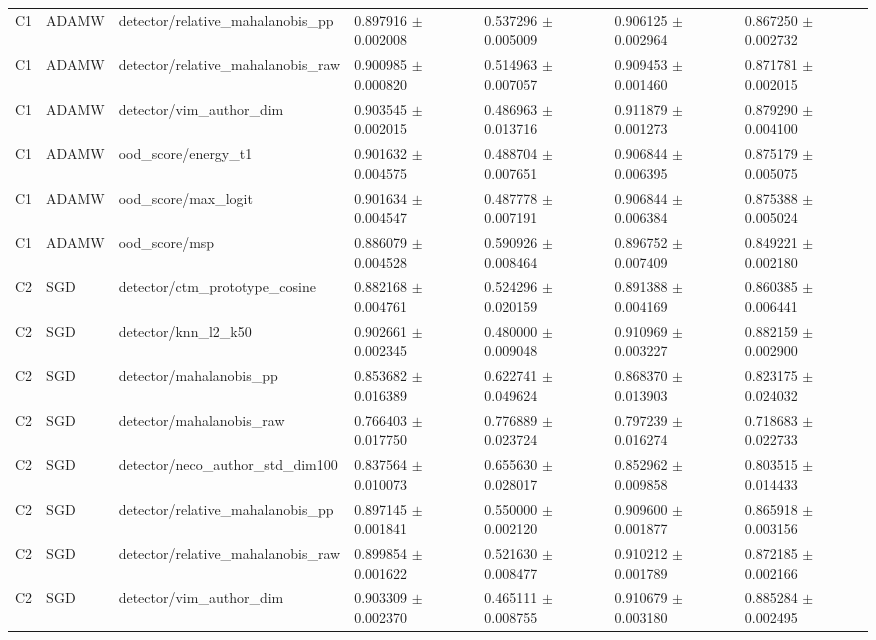 \begin{longtable}{lllllll}
C1 & ADAMW & detector/relative\_mahalanobis\_pp & 0.897916 $\pm$ 0.002008 & 0.537296 $\pm$ 0.005009 & 0.906125 $\pm$ 0.002964 & 0.867250 $\pm$ 0.002732 \\
C1 & ADAMW & detector/relative\_mahalanobis\_raw & 0.900985 $\pm$ 0.000820 & 0.514963 $\pm$ 0.007057 & 0.909453 $\pm$ 0.001460 & 0.871781 $\pm$ 0.002015 \\
C1 & ADAMW & detector/vim\_author\_dim & 0.903545 $\pm$ 0.002015 & 0.486963 $\pm$ 0.013716 & 0.911879 $\pm$ 0.001273 & 0.879290 $\pm$ 0.004100 \\
C1 & ADAMW & ood\_score/energy\_t1 & 0.901632 $\pm$ 0.004575 & 0.488704 $\pm$ 0.007651 & 0.906844 $\pm$ 0.006395 & 0.875179 $\pm$ 0.005075 \\
C1 & ADAMW & ood\_score/max\_logit & 0.901634 $\pm$ 0.004547 & 0.487778 $\pm$ 0.007191 & 0.906844 $\pm$ 0.006384 & 0.875388 $\pm$ 0.005024 \\
C1 & ADAMW & ood\_score/msp & 0.886079 $\pm$ 0.004528 & 0.590926 $\pm$ 0.008464 & 0.896752 $\pm$ 0.007409 & 0.849221 $\pm$ 0.002180 \\
C2 & SGD & detector/ctm\_prototype\_cosine & 0.882168 $\pm$ 0.004761 & 0.524296 $\pm$ 0.020159 & 0.891388 $\pm$ 0.004169 & 0.860385 $\pm$ 0.006441 \\
C2 & SGD & detector/knn\_l2\_k50 & 0.902661 $\pm$ 0.002345 & 0.480000 $\pm$ 0.009048 & 0.910969 $\pm$ 0.003227 & 0.882159 $\pm$ 0.002900 \\
C2 & SGD & detector/mahalanobis\_pp & 0.853682 $\pm$ 0.016389 & 0.622741 $\pm$ 0.049624 & 0.868370 $\pm$ 0.013903 & 0.823175 $\pm$ 0.024032 \\
C2 & SGD & detector/mahalanobis\_raw & 0.766403 $\pm$ 0.017750 & 0.776889 $\pm$ 0.023724 & 0.797239 $\pm$ 0.016274 & 0.718683 $\pm$ 0.022733 \\
C2 & SGD & detector/neco\_author\_std\_dim100 & 0.837564 $\pm$ 0.010073 & 0.655630 $\pm$ 0.028017 & 0.852962 $\pm$ 0.009858 & 0.803515 $\pm$ 0.014433 \\
C2 & SGD & detector/relative\_mahalanobis\_pp & 0.897145 $\pm$ 0.001841 & 0.550000 $\pm$ 0.002120 & 0.909600 $\pm$ 0.001877 & 0.865918 $\pm$ 0.003156 \\
C2 & SGD & detector/relative\_mahalanobis\_raw & 0.899854 $\pm$ 0.001622 & 0.521630 $\pm$ 0.008477 & 0.910212 $\pm$ 0.001789 & 0.872185 $\pm$ 0.002166 \\
C2 & SGD & detector/vim\_author\_dim & 0.903309 $\pm$ 0.002370 & 0.465111 $\pm$ 0.008755 & 0.910679 $\pm$ 0.003180 & 0.885284 $\pm$ 0.002495 \\

\end{longtable}
